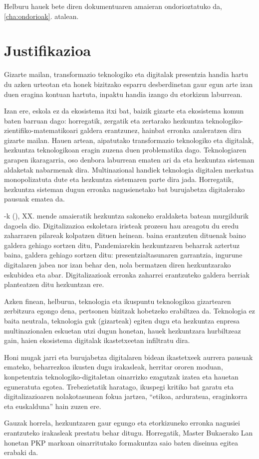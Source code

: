 Helburu hauek bete diren dokumentuaren amaieran ondorioztatuko da, \ref{cha:ondorioak}. atalean.\\

{\let\clearpage\relax \chapter{Justifikazioa}\label{cha:justifikazioa}}
Gizarte mailan, transformazio teknologiko eta digitalak presentzia handia hartu du azken urteotan eta honek bizitzako esparru desberdinetan gaur egun arte izan duen eragina kontuan hartuta, inpaktu handia izango du etorkizun laburrean.

Izan ere, eskola ez da ekosistema itxi bat, baizik gizarte eta ekosistema komun baten barruan dago: horregatik, zergatik eta zertarako hezkuntza teknologiko-zientifiko-matematikoari galdera erantzunez, hainbat erronka azaleratzen dira gizarte mailan. Hauen artean, aipatutako transformazio teknologiko eta digitalak, hezkuntza teknologikoan eragin zuzena duen problematika dago. Teknologiaren garapen ikaragarria, oso denbora laburrean ematen ari da eta hezkuntza sisteman aldaketak nabarmenak dira. Multinazional handiek teknologia digitalen merkatua monopolizatuta dute eta hezkuntza sistemaren parte dira jada. Horregatik, hezkuntza sisteman dugun erronka nagusienetako bat burujabetza digitalerako pausuak ematea da.

\citeauthor{ehd2021manifestua}-k (\citeyear{ehd2021manifestua}), XX. mende amaieratik hezkuntza sakoneko eraldaketa batean murgildurik dagoela dio. Digitalizazioa eskoletara iristeak prozesu hau areagotu du eredu zaharraren pilareak kolpatzen dituen heinean. baina erantzuten dituenak baino galdera gehiago sortzen ditu, Pandemiarekin hezkuntzaren beharrak aztertuz baina, galdera gehiago sortzen ditu: presentzialtasunaren garrantzia, ingurune digitalaren jabea nor izan behar den, nola bermatzen diren hezkuntzarako eskubidea eta abar. Digitalizazioak erronka zaharrei erantzuteko galdera berriak planteatzen ditu hezkuntzan ere.

Azken finean, helburua, teknologia eta ikuspuntu teknologikoa gizartearen zerbitzura egongo dena, pertsonen bizitzak hobetzeko erabiltzea da. Teknologia ez baita neutrala, teknologia guk (gizarteak) egiten dugu eta hezkuntza enpresa multinazionalen eskuetan utzi dugun honetan, hauek hezkuntzara hurbiltzeaz gain, haien ekosistema digitalak ikastetxeetan infiltratu dira. 

Honi mugak jarri eta burujabetza digitalaren bidean ikastetxeek aurrera pausuak emateko, beharrezkoa ikusten dugu irakasleak, herritar ororen moduan, konpetentzia teknologiko-digitaletan oinarrizko ezagutzak izatea eta hauetan eguneratuta egotea. Trebezietatik haratago, ikuspegi kritiko bat garatu eta digitalizazioaren nolakotasunean fokua jartzea, “etikoa, arduratsua, eraginkorra eta euskalduna” hain zuzen ere.

Gauzak horrela, hezkuntzaren gaur egungo eta etorkizuneko erronka nagusiei erantzuteko irakasleak prestatu behar ditugu. Horregatik, Master Bukaerako Lan honetan PKP markoan oinarritutako formakuntza saio baten diseinua egitea erabaki da.
